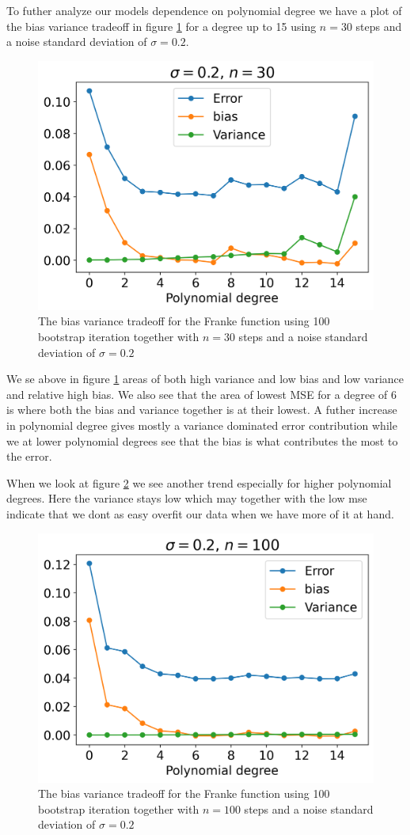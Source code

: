 \documentclass[12pt]{article}
\begin{document}
To futher analyze our models dependence on polynomial degree we have a plot of the bias variance tradeoff in figure \ref{fig:bias_variance} for a degree up to 15 using $n=30$ steps and a noise standard deviation of $\sigma=0.2$.
\begin{figure}[H]
  \centering
  \includegraphics[width=.7\textwidth]{../figures/bias_variance_tradeoff.png}
  \caption{The bias variance tradeoff for the Franke function using 100 bootstrap iteration together with $n=30$ steps and a noise standard deviation of $\sigma=0.2$}
  \label{fig:bias_variance}
\end{figure}
We se above in figure \ref{fig:bias_variance} areas of both high variance and low bias and low variance and relative high bias. We also see that the area of lowest MSE for a degree of 6 is where both the bias and variance together is at their lowest. A futher increase in polynomial degree gives mostly a variance dominated error contribution while we at lower polynomial degrees see that the bias is what contributes the most to the error.

When we look at figure \ref{fig:bias_variance_100} we see another trend especially for higher polynomial degrees. Here the variance stays low which may together with the low mse indicate that we dont as easy overfit our data when we have more of it at hand.
\begin{figure}[H]
  \centering
  \includegraphics[width=.7\textwidth]{../figures/bias_variance_100.png}
  \caption{The bias variance tradeoff for the Franke function using 100 bootstrap iteration together with $n=100$ steps and a noise standard deviation of $\sigma=0.2$}
  \label{fig:bias_variance_100}
\end{figure}
\end{document}
